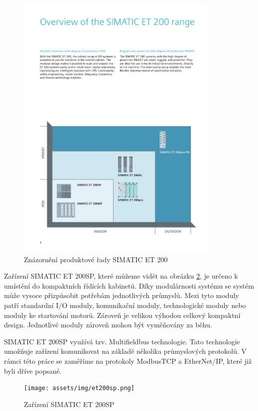 \begin{figure}[htbp]
    \centering 
    \includegraphics[width=0.87\textwidth]{assets/img/et200.pdf}
    \caption{Znázornění produktové řady SIMATIC ET 200}
    \label{fig:et200}
\end{figure}

Zařízení SIMATIC ET 200SP, které můžeme vidět na obrázku \ref{fig:et200sp}, je určeno k umístění do kompaktních řídících kabinetů. Díky modulárnosti systému se systém může vysoce přizpůsobit potřebám jednotlivých průmyslů. Mezi tyto moduly patří standardní I/O moduly, komunikační moduly, technologické moduly nebo moduly ke startování motorů. Zároveň je velikou výhodou celkový kompaktní design. Jednotlivé moduly zároveň mohou být vyměňovány za běhu. \cite{et200sp}

SIMATIC ET 200SP využívá tzv. Multifieldbus technologie. Tato technologie umožňuje zařízení komunikovat na základě několika průmyslových protokolů. V rámci této práce se zaměříme na protokoly ModbusTCP a EtherNet/IP, které již byli dříve popsané.

\begin{figure}[htbp]
    \centering 
    \texttt{[image: assets/img/et200sp.png]}
    \caption{Zařízení SIMATIC ET 200SP}
    \label{fig:et200sp}
\end{figure}